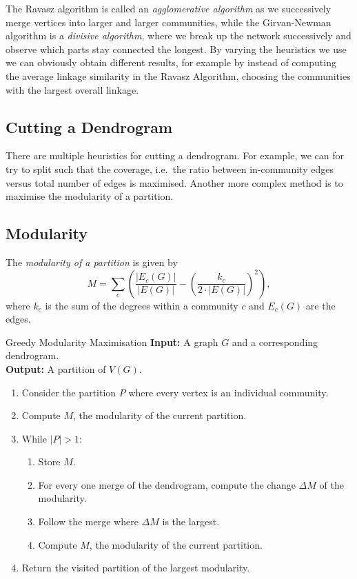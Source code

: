\documentclass[english]{panikzettel}
\begin{document}
The Ravasz algorithm is called an \textit{agglomerative algorithm} as we successively merge vertices into larger and larger communities, while the Girvan-Newman algorithm is a \textit{divisive algorithm}, where we break up the network successively and observe which parts stay connected the longest.
By varying the heuristics we use we can obviously obtain different results, for example by instead of computing the average linkage similarity in the Ravasz Algorithm, choosing the communities with the largest overall linkage.

\subsection{Cutting a Dendrogram}

There are multiple heuristics for cutting a dendrogram. For example, we can for try to split such that the coverage, i.e.\ the ratio between in-community edges versus total number of edges is maximised. Another more complex method is to maximise the modularity of a partition.

\subsection{Modularity}

The \emph{modularity of a partition} is given by
\[
    M= \sum_c \left(\frac{|E_c(G)|}{|E(G)|} - \left(\frac{k_c}{2\cdot|E(G)|}\right)^2 \right),
\]
where $k_c$ is the sum of the degrees within a community $c$ and $E_c(G)$ are the edges.

\begin{algo}{Greedy Modularity Maximisation}
    \textbf{Input:} A graph $G$ and a corresponding dendrogram. \\
    \textbf{Output:} A partition of $V(G)$.
    \tcblower
    \begin{enumerate}
            \item Consider the partition $P$ where every vertex is an individual community.
            \item Compute $M$, the modularity of the current partition.
            \item While $|P| > 1$:
                \begin{enumerate}
                        \item Store $M$.
                        \item For every one merge of the dendrogram, compute the change $\Delta M$ of the modularity.
                        \item Follow the merge where $\Delta M$ is the largest.
                        \item Compute $M$, the modularity of the current partition.
                \end{enumerate}
            \item Return the visited partition of the largest modularity.
    \end{enumerate}
\end{algo}
\end{document}
